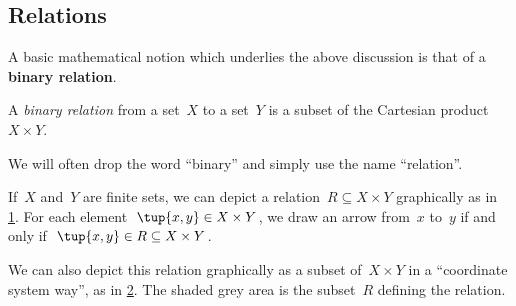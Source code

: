\subsection{Relations}

A basic mathematical notion which underlies the above discussion is that of a \textbf{binary relation}. 


\begin{definition}
A \emph{binary relation} from a set~$X$ to a set~$Y$ is a subset of the Cartesian product $X\times Y$. 
\end{definition}

\begin{remark}
We will often drop the word ``binary'' and simply use the name ``relation''.  
\end{remark}

If~$X$ and~$Y$ are finite sets, we can depict a relation~$R \subseteq X \times Y$ graphically as in \cref{fig:example_rel}. For each element~$\tup{x,y} \in X \times Y$, we draw an arrow from~$x$ to~$y$ if and only if~$\tup{x,y} \in R \subseteq X \times Y$. 

\begin{figure}[h!]
\centering
{}
 \caption{}
\label{fig:example_rel}
\end{figure}

We can also depict this relation graphically as a subset of~$X \times Y$ in a ``coordinate system way'', as in \cref{fig:example_rel_coord}. The shaded grey area is the subset~$R$ defining the relation. 

\begin{figure}[h!]
\begin{center}
\end{center}
\caption{}
\label{fig:example_rel_coord}
\end{figure}

